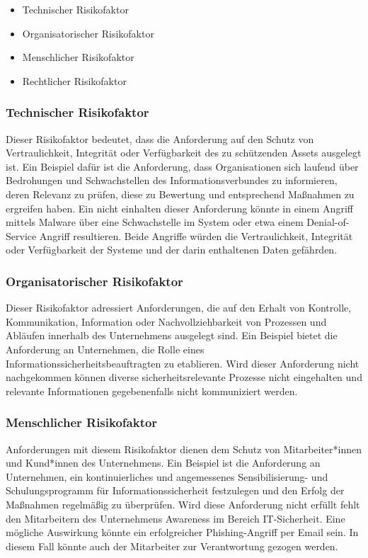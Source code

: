 \begin{itemize}
    \item Technischer Risikofaktor
    \item Organisatorischer Risikofaktor
    \item Menschlicher Risikofaktor
    \item Rechtlicher Risikofaktor
\end{itemize}


\subsubsection{Technischer Risikofaktor}
Dieser Risikofaktor bedeutet, dass die Anforderung auf den Schutz von Vertraulichkeit, Integrität oder Verfügbarkeit des zu schützenden Assets ausgelegt ist. Ein Beispiel dafür ist die Anforderung, dass Organisationen sich laufend über Bedrohungen und Schwachstellen des Informationsverbundes zu informieren, deren Relevanz zu prüfen, diese zu Bewertung und entsprechend Maßnahmen zu ergreifen haben. Ein nicht einhalten dieser Anforderung könnte in einem Angriff mittels Malware über eine Schwachstelle im System oder etwa einem Denial-of-Service Angriff resultieren. Beide Angriffe würden die Vertraulichkeit, Integrität oder Verfügbarkeit der Systeme und der darin enthaltenen Daten gefährden. 

\subsubsection{Organisatorischer Risikofaktor}
Dieser Risikofaktor adressiert Anforderungen, die auf den Erhalt von Kontrolle, Kommunikation, Information oder Nachvollziehbarkeit von Prozessen und Abläufen innerhalb des Unternehmens ausgelegt sind. Ein Beispiel bietet die Anforderung an Unternehmen, die Rolle eines Informationssicherheitsbeauftragten zu etablieren. Wird dieser Anforderung nicht nachgekommen können diverse sicherheitsrelevante Prozesse nicht eingehalten und relevante Informationen gegebenenfalls nicht kommuniziert werden.  

\subsubsection{Menschlicher Risikofaktor}
Anforderungen mit diesem Risikofaktor dienen dem Schutz von Mitarbeiter*innen und Kund*innen des Unternehmens. Ein Beispiel ist die Anforderung an Unternehmen, ein kontinuierliches und angemessenes Sensibilisierung- und Schulungsprogramm für Informationssicherheit festzulegen und den Erfolg der Maßnahmen regelmäßig zu überprüfen. Wird diese Anforderung nicht erfüllt fehlt den Mitarbeitern des Unternehmens Awareness im Bereich IT-Sicherheit. Eine mögliche Auswirkung könnte ein erfolgreicher Phishing-Angriff per Email sein. In diesem Fall könnte auch der Mitarbeiter zur Verantwortung gezogen werden. 


